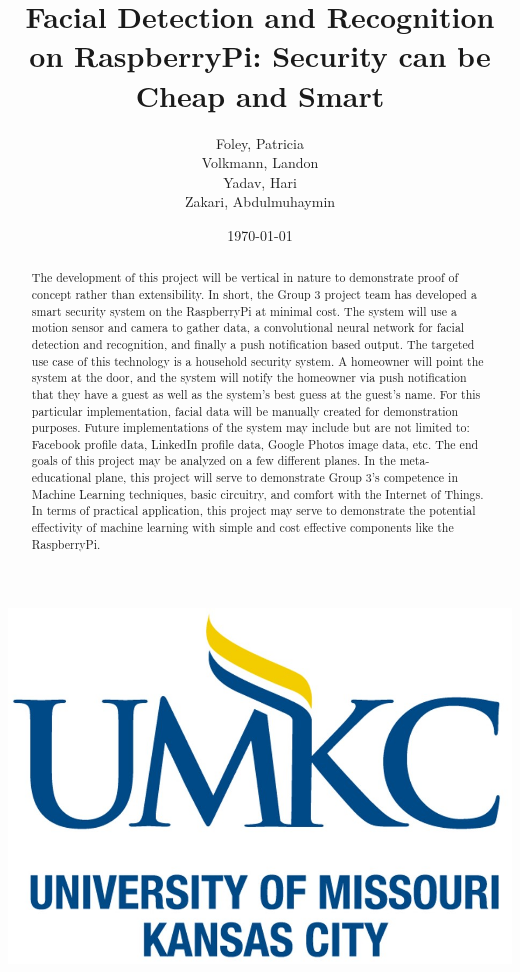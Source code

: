 \documentclass[11pt]{article}
\title{Facial Detection and Recognition on RaspberryPi: Security can be Cheap and Smart}
\author{Foley, Patricia\\Volkmann, Landon \\Yadav, Hari\\Zakari, Abdulmuhaymin}
\date{\today}
\begin{document}
\makeatletter
    \begin{titlepage}
        \begin{center}
            \includegraphics[width=0.7\linewidth]{UMKC.jpg}\\[4ex]
            {\huge \bfseries  \@title }\\[2ex] 
            {\LARGE  \@author}\\[30ex] 
            {\large \@date}
        \end{center}
    \end{titlepage}
\makeatother
\thispagestyle{empty}
\newpage

\thispagestyle{empty}
\newpage

\maketitle
\setcounter{page}{1} %

\begin{abstract}
The development of this project will be vertical in nature to demonstrate proof of concept rather than extensibility. In short, the Group 3 project team has developed a smart security system on the RaspberryPi at minimal cost. 
The system will use a motion sensor and camera to gather data, a convolutional neural network for facial detection and recognition, and finally a push notification based output. The targeted use case of this technology is a household security system. A homeowner will point the system at the door, and the system will notify the homeowner via push notification that they have a guest as well as the system’s best guess at the guest’s name. For this particular implementation, facial data will be manually created for demonstration purposes. Future implementations of the system may include but are not limited to: Facebook profile data, LinkedIn profile data, Google Photos image data, etc.
The end goals of this project may be analyzed on a few different planes. In the meta-educational plane, this project will serve to demonstrate Group 3’s competence in Machine Learning techniques, basic circuitry, and comfort with the Internet of Things. In terms of practical application, this project may serve to demonstrate the potential effectivity of machine learning with simple and cost effective components like the RaspberryPi.  

\end{abstract}
%
%
\end{document}
